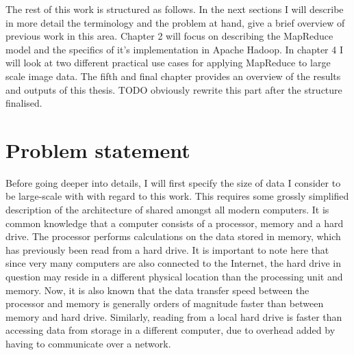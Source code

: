\documentclass [12pt,a4paper]{report}
\begin{document}
The rest of this work is structured as follows. In the next sections I will describe in more detail the terminology and the problem at hand, give a brief overview of previous work in this area. Chapter 2 will focus on describing the MapReduce model and the specifics of it's implementation in Apache Hadoop. In chapter 4 I will look at two different practical use cases for applying MapReduce to large scale image data. The fifth and final chapter provides an overview of the results and outputs of this thesis. TODO obviously rewrite this part after the structure finalised. %




	

\section{Problem statement}

Before going deeper into details, I will first specify the size of data I consider to be large-scale with with regard to this work. This requires some grossly simplified description of the architecture of shared amongst all modern computers. It is common knowledge that a computer consists of a processor, memory and a hard drive. The processor performs calculations on the data stored in memory, which has previously been read from a hard drive. It is important to note here that since very many computers are also connected to the Internet, the hard drive in question may reside in a different physical location than the processing unit and memory. Now, it is also known that the data transfer speed between the processor and memory is generally orders of magnitude faster than between memory and hard drive. Similarly, reading from a local hard drive is faster than accessing data from storage in a different computer, due to overhead added by having to communicate over a network.
\end{document}

